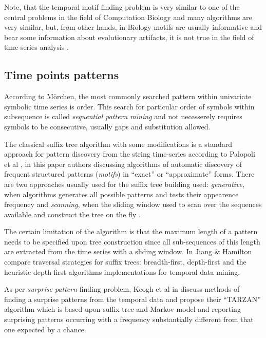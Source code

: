 Note, that the temporal motif finding problem is very similar to one of the central problems in the field of Computation Biology \cite{citeulike:465665} and many algorithms are very similar, but, from other hands, in Biology motifs are usually informative and bear some information about evolutionary artifacts, it is not true in the field of time-series analysis \cite{citeulike:3978085}.

\subsection{Time points patterns}
According to M\"orchen, the most commonly searched pattern within univariate symbolic time series is order. This search for particular order of symbols within subsequence is called \textit{sequential pattern mining} \cite{citeulike:775528} and not necesserely requires symbols to be consecutive, usually gaps and substitution allowed.

The classical suffix tree algorithm \cite{citeulike:707616} with some modifications is a standard approach for pattern discovery from the string time-series according to Palopoli et al \cite{citeulike:5003338}, in this paper authors discussing algorithms of automatic discovery of frequent structured patterns (\textit{motifs}) in ``exact'' or ``approximate'' forms. There are two approaches usually used for the suffix tree building used: \textit{generative}, when algorithms generates all possible patterns and tests their appearence frequency \cite{citeulike:5012661} and \textit{scanning}, when the sliding window used to scan over the sequences available and construct the tree on the fly \cite{citeulike:5012661}. 

The certain limitation of the algorithm is that the maximum length of a pattern needs to be specified upon tree construction since all sub-sequences of this length are extracted from the time series with a sliding window. In \cite{citeulike:5003404} Jiang \& Hamilton compare traversal strategies for suffix trees: breadth-first, depth-first and the heuristic depth-first algorithms implementations for temporal data mining.

As per \textit{surprise pattern} finding problem, Keogh et al in \cite{citeulike:3025877} discuss methods of finding a surprise patterns from the temporal data and propose their ``TARZAN'' algorithm which is based upon suffix tree and Markov model and reporting surprising patterns occurring with a frequency substantially different from that one expected by a chance.

